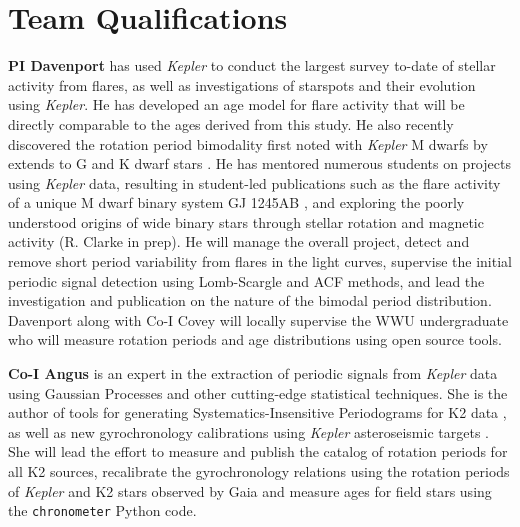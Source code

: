 \documentclass[12pt]{article}
\newcommand{\Kepler}{\textsl{Kepler}\xspace}
\begin{document}



\section{Team Qualifications}
{\bf PI Davenport} has used \Kepler to conduct the largest survey to-date of stellar activity from flares, as well as investigations of starspots and their evolution using \Kepler. He has developed an age model for flare activity that will be directly comparable to the ages derived from this study. He also recently discovered the rotation period bimodality first noted with \Kepler M dwarfs by \citet{mcquillan2013} extends to G and K dwarf stars \citep{davenport2017}. He has mentored numerous students on projects using \Kepler data, resulting in student-led publications such as the flare activity of a unique M dwarf binary system GJ 1245AB \citep{lurie2015}, and exploring the poorly understood origins of wide binary stars through stellar rotation and magnetic activity (R. Clarke in prep). He will manage the overall project, detect and remove short period variability from flares in the light curves, supervise the initial periodic signal detection using Lomb-Scargle and ACF methods, and lead the investigation and publication on the nature of the bimodal period distribution. Davenport along with Co-I Covey will locally supervise the WWU undergraduate who will measure rotation periods and age distributions using open source tools.

{\bf Co-I Angus} is an expert in the extraction of periodic signals from \Kepler
data using Gaussian Processes \citep{angus2016c} and other cutting-edge
statistical techniques.
She is the author of tools for generating Systematics-Insensitive Periodograms
for K2 data \citep{angus2016}, as well as new gyrochronology calibrations
using \Kepler asteroseismic targets \citep{angus2015}.
She will lead the effort to measure and publish the catalog of rotation
periods for all K2 sources, recalibrate the gyrochronology relations using the
rotation periods of \Kepler and K2 stars observed by Gaia and measure ages for
field stars using the {\tt chronometer} Python code.
\end{document}
